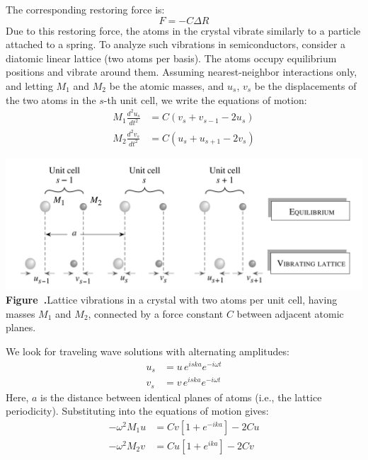 The corresponding restoring force is:
\begin{equation}
	F = -C \Delta R
\end{equation}
Due to this restoring force, the atoms in the crystal vibrate similarly to a particle attached to a spring. To analyze such vibrations in semiconductors, consider a diatomic linear lattice (two atoms per basis). The atoms occupy equilibrium positions and vibrate around them. Assuming nearest-neighbor interactions only, and letting \( M_1 \) and \( M_2 \) be the atomic masses, and \( u_s \), \( v_s \) be the displacements of the two atoms in the \( s \)-th unit cell, we write the equations of motion:
\begin{align}
	M_1 \frac{d^2 u_s}{dt^2} & = C (v_s + v_{s-1} - 2u_s) \\
	M_2 \frac{d^2 v_s}{dt^2} & = C (u_s + u_{s+1} - 2v_s)
\end{align}
\begin{center}
	\begin{minipage}{0.8\textwidth}
		\centering
		\includegraphics[width=\textwidth]{img/Vibrations.png}
		\\[0.5em]
		\textbf{Figure~\thefigure.}Lattice vibrations in a crystal with two atoms per unit cell, having masses $M_1$ and $M_2$, connected by a force constant $C$ between adjacent atomic planes.
		\label{fig:Potential_Energy}
	\end{minipage}
\end{center}
We look for traveling wave solutions with alternating amplitudes:
\begin{align}
	u_s & = u \, e^{i s k a} e^{-i \omega t} \\
	v_s & = v \, e^{i s k a} e^{-i \omega t}
\end{align}
Here, \( a \) is the distance between identical planes of atoms (i.e., the lattice periodicity). Substituting into the equations of motion gives:
\begin{align}
	-\omega^2 M_1 u & = C v [1 + e^{-ika}] - 2C u \\
	-\omega^2 M_2 v & = C u [1 + e^{ika}] - 2C v
\end{align}
